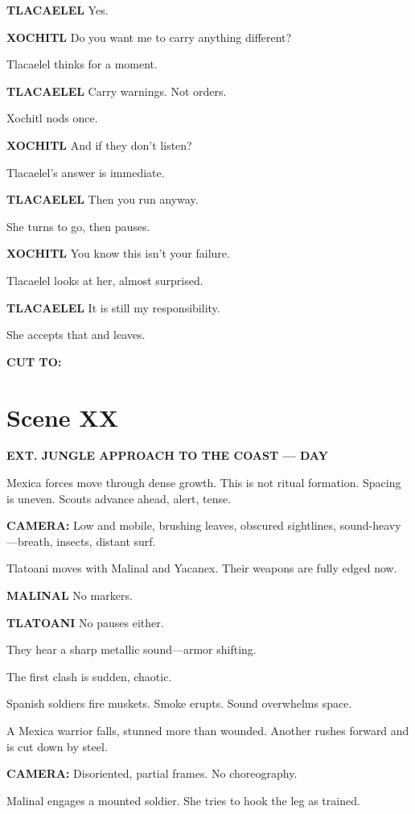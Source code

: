 \documentclass[12pt]{article}
\begin{document}
\textbf{TLACAELEL}  
Yes.

\textbf{XOCHITL}  
Do you want me to carry anything different?

Tlacaelel thinks for a moment.

\textbf{TLACAELEL}  
Carry warnings.  
Not orders.

Xochitl nods once.

\textbf{XOCHITL}  
And if they don’t listen?

Tlacaelel’s answer is immediate.

\textbf{TLACAELEL}  
Then you run anyway.

She turns to go, then pauses.

\textbf{XOCHITL}  
You know this isn’t your failure.

Tlacaelel looks at her, almost surprised.

\textbf{TLACAELEL}  
It is still my responsibility.

She accepts that and leaves.

\textbf{CUT TO:}

\section*{Scene XX}

\textbf{EXT. JUNGLE APPROACH TO THE COAST — DAY}

Mexica forces move through dense growth. This is not ritual formation. Spacing is uneven. Scouts advance ahead, alert, tense.

\textbf{CAMERA:} Low and mobile, brushing leaves, obscured sightlines, sound-heavy—breath, insects, distant surf.

Tlatoani moves with Malinal and Yacanex. Their weapons are fully edged now.

\textbf{MALINAL}  
No markers.

\textbf{TLATOANI}  
No pauses either.

They hear a sharp metallic sound—armor shifting.

The first clash is sudden, chaotic.

Spanish soldiers fire muskets. Smoke erupts. Sound overwhelms space.

A Mexica warrior falls, stunned more than wounded. Another rushes forward and is cut down by steel.

\textbf{CAMERA:} Disoriented, partial frames. No choreography.

Malinal engages a mounted soldier. She tries to hook the leg as trained.
\end{document}
